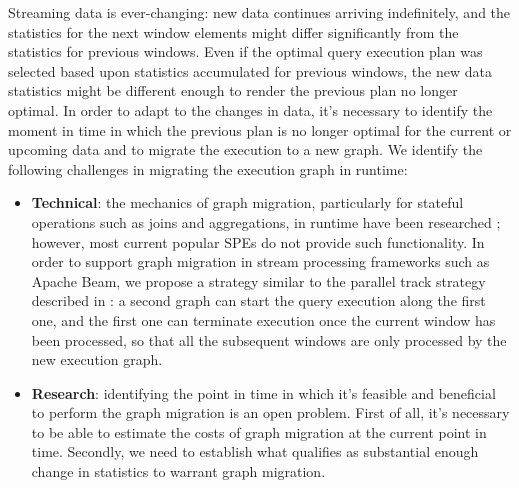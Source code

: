 Streaming data is ever-changing: new data continues arriving indefinitely, and the statistics for the next window elements might differ significantly from the statistics for previous windows. Even if the optimal query execution plan was selected based upon statistics accumulated for previous windows, the new data statistics might be different enough to render the previous plan no longer optimal. In order to adapt to the changes in data, it's necessary to identify the moment in time in which the previous plan is no longer optimal for the current or upcoming data and to migrate the execution to a new graph. %
We identify the following challenges in migrating the execution graph in runtime:
\begin{itemize}
    \item \textbf{Technical}: the mechanics of graph migration, particularly for stateful operations such as joins and aggregations, in runtime have been researched \cite{zhu2004dynamic}; %
    however, most current popular SPEs do not provide such functionality. In order to support graph migration in stream processing frameworks such as Apache Beam, we propose a strategy similar to the parallel track strategy described in \cite{zhu2004dynamic}: a second graph can start the query execution along the first one, and the first one can terminate execution once the current window has been processed, so that all the subsequent windows are only processed by the new execution graph.
    \item \textbf{Research}: identifying the point in time in which it's feasible and beneficial to perform the graph migration is an open problem. First of all, it's necessary to be able to estimate the costs of graph migration at the current point in time. Secondly, we need to establish what qualifies as substantial enough change in statistics to warrant graph migration. %
\end{itemize}